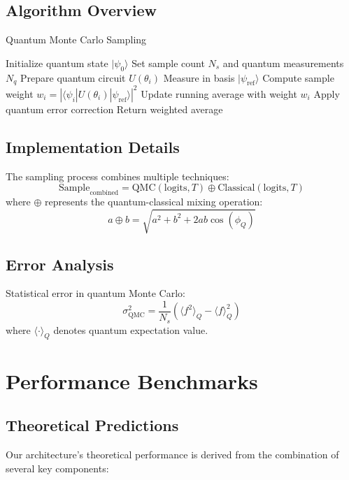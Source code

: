\documentclass{article}
\begin{document}
\subsection{Algorithm Overview}
\begin{algorithm}[H]
\caption{Quantum Monte Carlo Sampling}
\begin{algorithmic}[1]
\STATE Initialize quantum state $|\psi_0\rangle$
\STATE Set sample count $N_s$ and quantum measurements $N_q$
\STATE Prepare quantum circuit $U(\theta_i)$
\STATE Measure in basis ${|\psi_{\text{ref}}\rangle}$
\STATE Compute sample weight $w_i = |\langle \psi_i|U(\theta_i)|\psi_{\text{ref}}\rangle|^2$
\STATE Update running average with weight $w_i$
\ENDFOR
\STATE Apply quantum error correction
\STATE Return weighted average
\end{algorithmic}
\end{algorithm}

\subsection{Implementation Details}
The sampling process combines multiple techniques:
\begin{equation}
\text{Sample}_{\text{combined}} = \text{QMC}(\text{logits}, T) \oplus \text{Classical}(\text{logits}, T)
\end{equation}
where $\oplus$ represents the quantum-classical mixing operation:
\begin{equation}
a \oplus b = \sqrt{a^2 + b^2 + 2ab\cos(\phi_Q)}
\end{equation}

\subsection{Error Analysis}
Statistical error in quantum Monte Carlo:
\begin{equation}
\sigma_{\text{QMC}}^2 = \frac{1}{N_s}\left(\langle f^2\rangle_Q - \langle f\rangle_Q^2\right)
\end{equation}
where $\langle \cdot \rangle_Q$ denotes quantum expectation value.

\section{Performance Benchmarks}

\subsection{Theoretical Predictions}
Our architecture's theoretical performance is derived from the combination of several key components:
\end{document}

